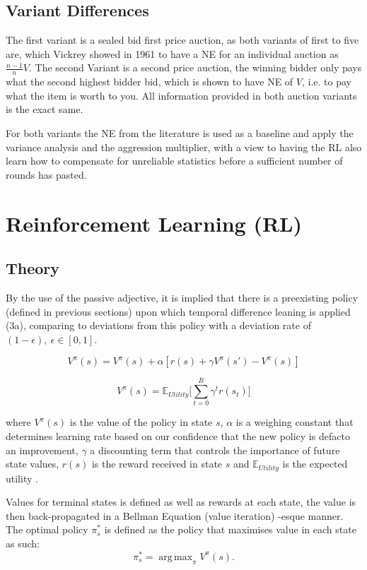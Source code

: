 \documentclass[10pt,conference,twocolumn]{IEEEtran}
\DeclareMathOperator*{\argmax}{arg\,max}
\begin{document}
\subsection{Variant Differences}

The first variant is a sealed bid first price auction, as both variants of first to five are, which Vickrey showed in 1961\cite{Vickrey} to have a NE for an individual auction as $\frac{n-1}{n}V$. The second Variant is a second price auction, the winning bidder only pays what the second highest bidder bid, which is shown to have NE of $V$\cite{Vickrey}, i.e. to pay what the item is worth to you. All information provided in both auction variants is the exact same.

For both variants the NE from the literature is used as a baseline and apply the variance analysis and the aggression multiplier, with a view to having the RL also learn how to compensate for unreliable statistics before a sufficient number of rounds has pasted.

\section{Reinforcement Learning (RL)}
\subsection{Theory}
By the use of the passive adjective, it is implied that there is a preexisting policy (defined in previous sections) upon which temporal difference leaning is applied (3a), comparing to deviations from this policy with a deviation rate of $(1-\epsilon), \: \epsilon \in [0,1]$.

$$ V^{\pi}(s) = V^{\pi}(s) + \alpha[r(s) + \gamma V^{\pi}(s')-V^{\pi}(s)]$$

$$V^{\pi}(s) = \mathbb{E}_{Utility}\bigg[ \sum_{t=0}^R \gamma^t r(s_t) \bigg]$$

where $V^{\pi}(s)$ is the value of the policy in state $s$, $\alpha$ is a weighing constant that determines learning rate based on our confidence that the new policy is defacto an improvement, $\gamma$ a discounting term that controls the importance of future state values, $r(s)$ is the reward received in state $s$ and $\mathbb{E}_{Utility}$ is the expected utility \cite{RLtextbook}.

Values for terminal states is defined as well as rewards at each state, the value is then back-propagated in a Bellman Equation (value iteration) -esque manner. The optimal policy $\pi_s^*$ is defined as the policy that maximises value in each state as such:
$$\pi_s^* = \argmax_{\pi} V^{\pi}(s).$$
\end{document}
